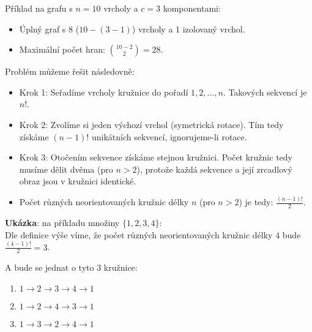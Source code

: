 \documentclass[10pt, a4paper]{ReportSheet}
\begin{document}
    Příklad na grafu s $n=10$ vrcholy a $c=3$ komponentami:
    \begin{itemize}
        \item Úplný graf s 8 ($10-(3-1)$) vrcholy a 1 izolovaný vrchol.
        \item Maximální počet hran: $\binom{10-2}{2} = 28$.
    \end{itemize}

    \newpage

    \newpage

    Problém můžeme řešit následovně:
    \begin{itemize}
        \item Krok 1: Seřadíme vrcholy kružnice do pořadí $1, 2, \ldots, n$. Takových sekvencí je $n!$.
        \item Krok 2: Zvolíme si jeden výchozí vrchol (symetrická rotace). Tím tedy získáme $(n-1)!$ unikátních sekvencí, ignorujeme-li rotace.
        \item Krok 3: Otočením sekvence získáme stejnou kružnici. Počet kružnic tedy musíme dělit dvěma (pro $n>2$), protože každá sekvence a její zrcadlový obraz jsou v kružnici identické.
        \item Počet různých neorientovaných kružnic délky $n$ (pro $n>2$) je tedy: $\frac{(n-1)!}{2}$.
    \end{itemize}

    \textbf{Ukázka}: na příkladu množiny $\{1, 2, 3, 4\}$:\\
    Dle definice výše víme, že počet různých neorientovaných kružnic délky $4$ bude $\frac{(4-1)!}{2} = 3$.

    A bude se jednat o tyto 3 kružnice:
    \begin{enumerate}
        \item $1 \rightarrow 2 \rightarrow 3 \rightarrow 4 \rightarrow 1$
        \item $1 \rightarrow 2 \rightarrow 4 \rightarrow 3 \rightarrow 1$
        \item $1 \rightarrow 3 \rightarrow 2 \rightarrow 4 \rightarrow 1$
    \end{enumerate}
\end{document}
